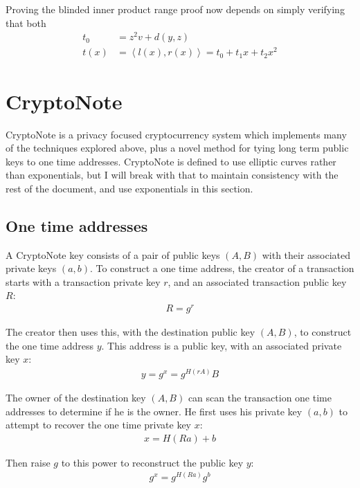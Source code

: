 \documentclass{article}
\begin{document}
Proving the blinded inner product range proof now depends on simply verifying that both 
\begin{align}
  t_0 &= z^2 v + d(y,z)\\
  t(x) &= \left<l(x), r(x)\right> = t_0 + t_1 x + t_2 x^2
\end{align}



\section{CryptoNote}

CryptoNote is a privacy focused cryptocurrency system which implements many of the techniques explored above, plus a novel method for tying long term public keys to one time addresses.  CryptoNote is defined to use elliptic curves rather than exponentials, but I will break with that to maintain consistency with the rest of the document, and use exponentials in this section.


\subsection{One time addresses}

A CryptoNote key consists of a pair of public keys $(A, B)$ with their associated private keys $(a, b)$.  To construct a one time address, the creator of a transaction starts with a transaction private key $r$, and an associated transaction public key $R$:
\begin{align}
  R=g^r
\end{align}

The creator then uses this, with the destination public key $(A, B)$, to construct the one time address $y$.  This address is a public key, with an associated private key $x$:
\begin{align}
  y = g^x = g^{H(rA)} B
\end{align}

The owner of the destination key $(A, B)$ can scan the transaction one time addresses to determine if he is the owner.  He first uses his private key $(a, b)$ to attempt to recover the one time private key $x$:
\begin{align}
	x = H(Ra) + b
\end{align}

Then raise $g$ to this power to reconstruct the public key $y$:
\begin{align}
  g^x = g^{H(Ra)} g^b
\end{align}
\end{document}
